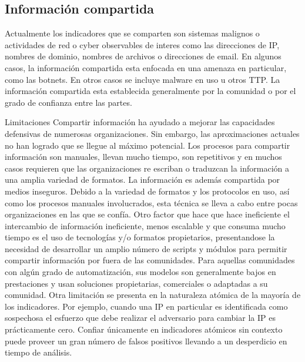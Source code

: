 \subsection{Información compartida}
Actualmente los indicadores que se comparten son sistemas malignos o actividades de red 
o cyber observables de interes como las direcciones de IP, nombres de dominio, 
nombres de archivos o direcciones de email. En algunos casos, la información 
compartida esta enfocada en una amenaza en particular, como las botnets. En 
otros casos se incluye malware en uso u otros TTP. La información compartida 
esta establecida generalmente por la comunidad o por el grado de confianza entre 
las partes.

Limitaciones
Compartir información ha ayudado a mejorar las capacidades defensivas de 
numerosas organizaciones. Sin embargo, las aproximaciones actuales no han 
logrado que se llegue al máximo potencial. Los procesos para compartir 
información son manuales, llevan mucho tiempo, son repetitivos y en muchos casos 
requieren que  las organizaciones re escriban o traduzcan la información a una 
amplia variedad de formatos. La información es además compartida por medios 
inseguros. Debido a la variedad de formatos y los protocolos en uso, así como 
los procesos manuales involucrados, esta técnica se lleva a cabo entre pocas 
organizaciones en las que se confía.
Otro factor que hace que hace ineficiente el intercambio de información 
ineficiente, menos escalable y que consuma mucho tiempo es el uso de tecnologías 
y/o formatos propietarios, presentandose la necesidad de desarrollar un amplio 
número de scripts y módulos para permitir compartir información por fuera de las 
comunidades. Para aquellas comunidades con algún grado de automatización, sus 
modelos son generalmente bajos en prestaciones y usan soluciones propietarias,
comerciales o adaptadas a su comunidad.
Otra limitación se presenta en la naturaleza atómica de la mayoría de los 
indicadores. Por ejemplo, cuando una IP en particular es identificada como 
sospechosa el esfuerzo que debe realizar el adversario para cambiar la IP es 
prácticamente cero. Confiar únicamente en indicadores atómicos sin contexto 
puede proveer un gran número de falsos positivos llevando a un desperdicio en 
tiempo de análisis.

